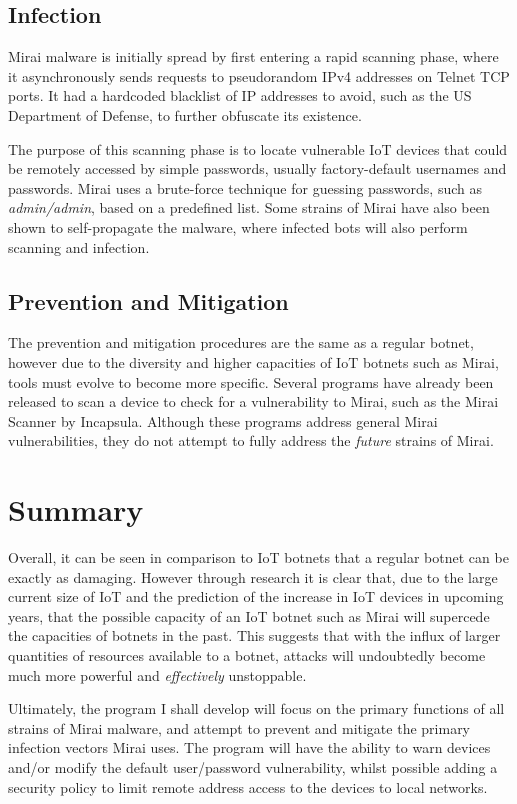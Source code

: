 \subsection{Infection}

Mirai malware is initially spread by first entering a rapid scanning phase, where it asynchronously sends requests to pseudorandom IPv4 addresses on Telnet TCP ports. It had a hardcoded blacklist of IP addresses to avoid, such as the US Department of Defense, to further obfuscate its existence\textsuperscript{\cite{aprilunderstanding}}.

The purpose of this scanning phase is to locate vulnerable IoT devices that could be remotely accessed by simple passwords, usually factory-default usernames and passwords. Mirai uses a brute-force technique for guessing passwords, such as \textit{admin/admin}, based on a predefined list. Some strains of Mirai have also been shown to self-propagate the malware, where infected bots will also perform scanning and infection.

\subsection{Prevention and Mitigation}

The prevention and mitigation procedures are the same as a regular botnet, however due to the diversity and higher capacities of IoT botnets such as Mirai, tools must evolve to become more specific. Several programs have already been released to scan a device to check for a vulnerability to Mirai, such as the Mirai Scanner by Incapsula\textsuperscript{\cite{incapsulascanner}}. Although these programs address general Mirai vulnerabilities, they do not attempt to fully address the \textit{future} strains of Mirai.

\section{Summary}
Overall, it can be seen in comparison to IoT botnets that a regular botnet can be exactly as damaging. However through research it is clear that, due to the large current size of IoT and the prediction of the increase in IoT devices in upcoming years, that the possible capacity of an IoT botnet such as Mirai will supercede the capacities of botnets in the past. This suggests that with the influx of larger quantities of resources available to a botnet, attacks will undoubtedly become much more powerful and \textit{effectively} unstoppable.

\vspace{0.5cm}

Ultimately, the program I shall develop will focus on the primary functions of all strains of Mirai malware, and attempt to prevent and mitigate the primary infection vectors Mirai uses. The program will have the ability to warn devices and/or modify the default user/password vulnerability, whilst possible adding a security policy to limit remote address access to the devices to local networks.